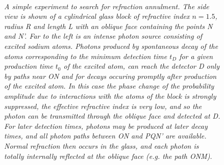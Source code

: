 {\begin{figure}[htbp]
\begin{center}
\hspace*{-0.5cm}\mbox{
}
\caption{{\sl A simple experiment to search for refraction annulment.
 The side view is shown of a cylindrical glass block of
   refractive index $n = 1.5$, radius R and length L 
 with an oblique face
 containing the points N and N'. Far to the left is 
 an intense photon source consisting of excited sodium atoms.
 Photons produced by spontaneous decay of the atoms
 corresponding to the minimum detection time $t_D$ for a given production
 time $t_0$ of the excited atom,
 can reach the detector D only by paths near ON and for decays occuring
 promptly after production of the excited atom. In this case the phase
 change of the probability amplitude due to interactions with the atoms of 
 the block is strongly suppressed, the effective refractive index is very low, and so
 the photon
 can be transmitted through the oblique face and detected at D. For later detection times, photons
 may be produced
 at later decay times, and all photon paths between ON and PQN' are available.
 Normal refraction then occurs in the glass, and each photon is 
 totally internally reflected at the oblique face (e.g. the path ONM).}} 
\label{fig-fig4}
\end{center}
\end{figure}

}
